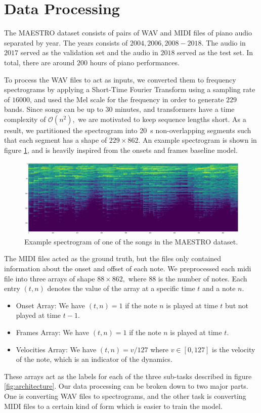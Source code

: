 \documentclass[a4paper,twocolumn,10pt]{article}
\begin{document}
\section{Data Processing}
The MAESTRO dataset consists of pairs of WAV and MIDI files of piano audio separated by year. The years consists of $2004,2006,2008-2018.$ The audio in $2017$ served as the validation set and the audio in $2018$ served as the test set. In total, there are around $200$ hours of piano performances.

To process the WAV files to act as inputs, we converted them to frequency spectrograms by applying a Short-Time Fourier Transform using a sampling rate of $16000$, and used the Mel scale for the frequency in order to generate $229$ bands. Since songs can be up to $30$ minutes, and transformers have a time complexity of $\mathcal{O}(n^2),$ we are motivated to keep sequence lengths short. As a result, we partitioned the spectrogram into \SI{20}{s} non-overlapping segments such that each segment has a shape of $229 \times 862.$ An example spectrogram is shown in figure \ref{fig:spectrogram}, and is heavily inspired from the onsets and frames baseline model\cite{onsets_and_frames}.
\begin{figure}
  \centering
  \includegraphics[width=0.8\linewidth]{figures/spectrogram.png}
  \caption{Example spectrogram of one of the songs in the MAESTRO dataset.}
  \label{fig:spectrogram}
\end{figure}

The MIDI files acted as the ground truth, but the files only contained information about the onset and offset of each note. We preprocessed each midi file into three arrays of shape $88 \times 862,$ where $88$ is the number of notes. Each entry $(t,n)$ denotes the value of the array at a specific time $t$ and a note $n$.
\begin{itemize}
  \item Onset Array: We have $(t,n)=1$ if the note $n$ is played at time $t$ but not played at time $t-1.$
  \item Frames Array: We have $(t,n)=1$ if the note $n$ is played at time $t$.
  \item Velocities Array: We have $(t,n)=v/127$ where $v \in [0,127]$ is the velocity of the note, which is an indicator of the dynamics.
\end{itemize}
These arrays act as the labels for each of the three sub-tasks described in figure \ref{fig:architecture}.
Our data processing can be broken down to two major parts. One is converting WAV files to spectrograms, and the other task is converting MIDI files to a certain kind of form which is easier to train the model.
\end{document}
